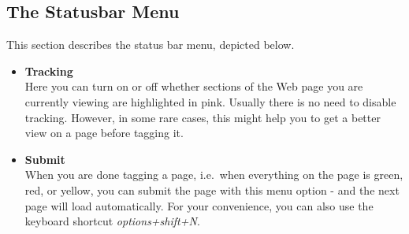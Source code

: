 \documentclass[12pt]{article}
\begin{document}
\subsection{The Statusbar Menu}

This section describes the status bar menu, depicted below. \\


\begin{itemize}
	\item {\large \textbf{Tracking}}\\
Here you can turn on or off whether sections of the Web page you are currently viewing are highlighted in pink. Usually there is no need to disable tracking. However, in some rare cases, this might help you to get a better view on a page before tagging it. \\
	\item {\large \textbf{Submit}}\\
When you are done tagging a page, i.e.~when everything on the page is green, red, or yellow, you can submit the page with this menu option - and the next page will load automatically. For your convenience, you can also use the keyboard shortcut \emph{options+shift+N}. \\


\end{itemize}
\end{document}
